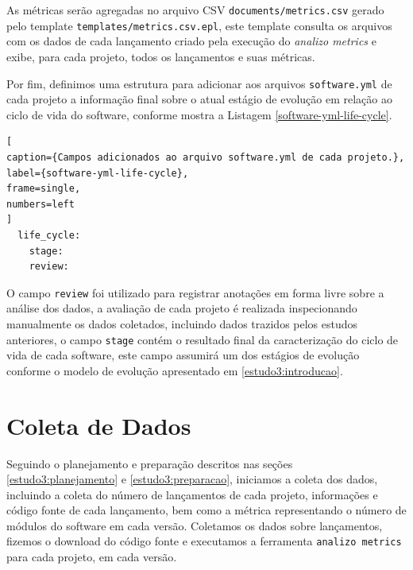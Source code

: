 As métricas serão agregadas no arquivo CSV \texttt{documents/metrics.csv}
gerado pelo template \texttt{templates/metrics.csv.epl}, este template consulta
os arquivos com os dados de cada lançamento criado pela execução do {\it analizo metrics}
e exibe, para cada projeto, todos os lançamentos e suas métricas.

Por fim, definimos uma estrutura para adicionar aos arquivos \texttt{software.yml} de
cada projeto a informação final sobre o atual estágio de evolução em relação ao
ciclo de vida do software, conforme mostra a Listagem \ref{software-yml-life-cycle}.

\begin{lstlisting}[
caption={Campos adicionados ao arquivo software.yml de cada projeto.},
label={software-yml-life-cycle},
frame=single,
numbers=left
]
  life_cycle:
    stage:
    review:
\end{lstlisting}

O campo \texttt{review} foi utilizado para registrar anotações em forma livre
sobre a análise dos dados, a avaliação de cada projeto é realizada
inspecionando manualmente os dados coletados, incluindo dados trazidos pelos
estudos anteriores, o campo \texttt{stage} contém o resultado final da
caracterização do ciclo de vida de cada software, este campo assumirá um dos
estágios de evolução conforme o modelo de evolução apresentado em
\ref{estudo3:introducao}.




\section{Coleta de Dados} \label{estudo3:coleta} %

Seguindo o planejamento e preparação descritos nas seções
\ref{estudo3:planejamento} e \ref{estudo3:preparacao}, iniciamos a coleta dos
dados, incluindo a coleta do número de lançamentos de cada projeto, informações
e código fonte de cada lançamento, bem como a métrica representando o número de
módulos do software em cada versão. Coletamos os dados sobre lançamentos,
fizemos o download do código fonte e executamos a ferramenta \texttt{analizo
metrics} para cada projeto, em cada versão.


